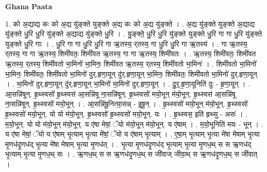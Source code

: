 \documentclass[17pt]{extarticle}
\begin{document}
\textbf{Ghana Paata } \newline

1. को अ॒द्याद्य कः को अ॒द्य यु॑ङ्क्ते युङ्क्ते अ॒द्य कः को अ॒द्य यु॑ङ्क्ते । . अ॒द्य यु॑ङ्क्ते युङ्क्ते अ॒द्याद्य यु॑ङ्क्ते धु॒रि धु॒रि यु॑ङ्क्ते अ॒द्याद्य यु॑ङ्क्ते धु॒रि । . यु॒ङ्क्ते॒ धु॒रि धु॒रि यु॑ङ्क्ते युङ्क्ते धु॒रि गा गा धु॒रि यु॑ङ्क्ते युङ्क्ते धु॒रि गाः । . धु॒रि गा गा धु॒रि धु॒रि गा ऋ॒तस्य॒ र्‌तस्य॒ गा धु॒रि धु॒रि गा ऋ॒तस्य॑ । . गा ऋ॒तस्य॒ र्‌तस्य॒ गा गा ऋ॒तस्य॒ शिमी॑वतः॒ शिमी॑वत ऋ॒तस्य॒ गा गा ऋ॒तस्य॒ शिमी॑वतः । . ऋ॒तस्य॒ शिमी॑वतः॒ शिमी॑वत ऋ॒तस्य॒ र्‌तस्य॒ शिमी॑वतो भा॒मिनो॑ भा॒मिनः॒ शिमी॑वत ऋ॒तस्य॒ र्‌तस्य॒ शिमी॑वतो भा॒मिनः॑ । . शिमी॑वतो भा॒मिनो॑ भा॒मिनः॒ शिमी॑वतः॒ शिमी॑वतो भा॒मिनो॑ दुर्.हृणा॒यून् दु॑र्.हृणा॒यून् भा॒मिनः॒ शिमी॑वतः॒ शिमी॑वतो भा॒मिनो॑ दुर्.हृणा॒यून् । . भा॒मिनो॑ दुर्.हृणा॒यून् दु॑र्.हृणा॒यून् भा॒मिनो॑ भा॒मिनो॑ दुर्.हृणा॒यून् । . दु॒र्॒.हृ॒णा॒यूनिति॑ दुः - हृ॒णा॒यून् । . आ॒सन्नि॑षून्. हृ॒थ्स्वसो॑ हृ॒थ्स्वस॑ आ॒सन्नि॑षू ना॒सन्नि॑षून्. हृ॒थ्स्वसो॑ मयो॒भून् म॑यो॒भून्. हृ॒थ्स्वस॑ आ॒सन्नि॑षू ना॒सन्नि॑षून्. हृ॒थ्स्वसो॑ मयो॒भून् । . आ॒सन्नि॑षू॒नित्या॒सन्न् - इ॒षू॒न् । . हृ॒थ्स्वसो॑ मयो॒भून् म॑यो॒भून्. हृ॒थ्स्वसो॑ हृ॒थ्स्वसो॑ मयो॒भून्. यो यो म॑यो॒भून्. हृ॒थ्स्वसो॑ हृ॒थ्स्वसो॑ मयो॒भून्. यः । . हृ॒थ्स्वस॒ इति॑ हृथ्सु - असः॑ । . म॒यो॒भून्. यो यो म॑यो॒भून् म॑यो॒भून्. य ए॑षा मेषां॒ ॅयो म॑यो॒भून् म॑यो॒भून्. य ए॑षाम् । . म॒यो॒भूनिति॑ मयः - भून् । . य ए॑षा मेषां॒ ॅयो य ए॑षाम् भृ॒त्याम् भृ॒त्या मे॑षां॒ ॅयो य ए॑षाम् भृ॒त्याम् । . ए॒षा॒म् भृ॒त्याम् भृ॒त्या मे॑षा मेषाम् भृ॒त्या मृ॒णध॑दृ॒णध॑द् भृ॒त्या मे॑षा मेषाम् भृ॒त्या मृ॒णध॑त् । . भृ॒त्या मृ॒णध॑दृ॒णध॑द् भृ॒त्याम् भृ॒त्या मृ॒णध॒थ् स स ऋ॒णध॑द् भृ॒त्याम् भृ॒त्या मृ॒णध॒थ् सः । . ऋ॒णध॒थ् स स ऋ॒णध॑दृ॒णध॒थ् स जी॑वाज् जीवा॒थ् स ऋ॒णध॑दृ॒णध॒थ् स जी॑वात् । \newline
\end{document}
